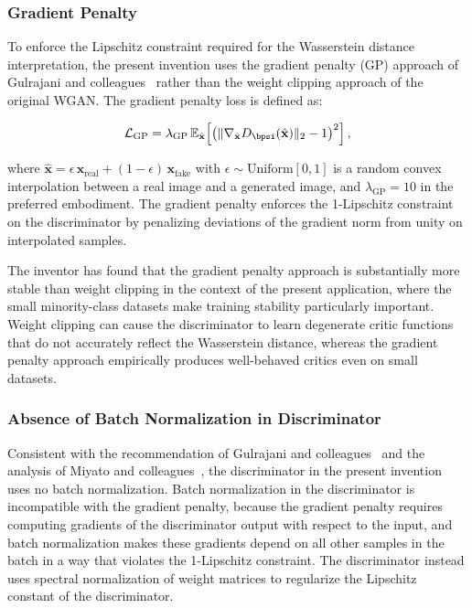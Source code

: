 \documentclass[12pt,letterpaper]{article}
\newcommand{\bx}{\mathbf{x}}
\newcommand{\EE}{\mathbb{E}}
\begin{document}
\subsubsection{Gradient Penalty}

To enforce the Lipschitz constraint required for the Wasserstein distance
interpretation, the present invention uses the gradient penalty (GP) approach
of Gulrajani and colleagues~\cite{gulrajani2017} rather than the weight
clipping approach of the original WGAN. The gradient penalty loss is defined as:

\begin{equation}
  \mathcal{L}_{\text{GP}} = \lambda_{\text{GP}}\,
    \EE_{\hat{\bx}}\!\left[\bigl(\|\nabla_{\hat{\bx}} D_{\bpsi}(\hat{\bx})\|_2 - 1\bigr)^2\right],
  \label{eq:gp}
\end{equation}

\noindent where $\hat{\bx} = \epsilon\,\bx_{\text{real}} + (1 - \epsilon)\,\bx_{\text{fake}}$
with $\epsilon \sim \text{Uniform}[0,1]$ is a random convex interpolation
between a real image and a generated image, and $\lambda_{\text{GP}} = 10$
in the preferred embodiment. The gradient penalty enforces the 1-Lipschitz
constraint on the discriminator by penalizing deviations of the gradient norm
from unity on interpolated samples.

The inventor has found that the gradient penalty approach is substantially more
stable than weight clipping in the context of the present application, where
the small minority-class datasets make training stability particularly
important. Weight clipping can cause the discriminator to learn degenerate
critic functions that do not accurately reflect the Wasserstein distance,
whereas the gradient penalty approach empirically produces well-behaved critics
even on small datasets.

\subsubsection{Absence of Batch Normalization in Discriminator}

Consistent with the recommendation of Gulrajani and colleagues~\cite{gulrajani2017}
and the analysis of Miyato and colleagues~\cite{miyato2018}, the discriminator
in the present invention uses no batch normalization. Batch normalization in
the discriminator is incompatible with the gradient penalty, because the
gradient penalty requires computing gradients of the discriminator output with
respect to the input, and batch normalization makes these gradients depend on
all other samples in the batch in a way that violates the 1-Lipschitz
constraint. The discriminator instead uses spectral normalization of weight
matrices to regularize the Lipschitz constant of the discriminator.
\end{document}
